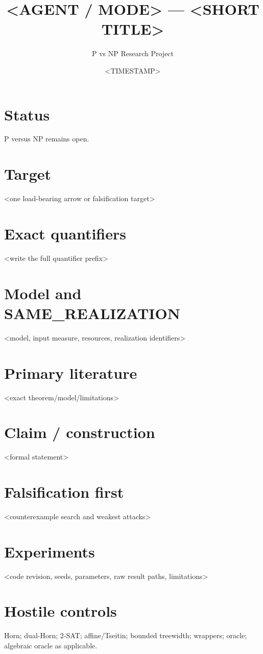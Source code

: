 \documentclass[11pt]{article}
\title{<AGENT / MODE> --- <SHORT TITLE>}
\author{P vs NP Research Project}
\date{<TIMESTAMP>}
\begin{document}
\maketitle

\section*{Status}
P versus NP remains open.

\section*{Target}
<one load-bearing arrow or falsification target>

\section*{Exact quantifiers}
<write the full quantifier prefix>

\section*{Model and SAME\_REALIZATION}
<model, input measure, resources, realization identifiers>

\section*{Primary literature}
<exact theorem/model/limitations>

\section*{Claim / construction}
<formal statement>

\section*{Falsification first}
<counterexample search and weakest attacks>

\section*{Experiments}
<code revision, seeds, parameters, raw result paths, limitations>

\section*{Hostile controls}
Horn; dual-Horn; 2-SAT; affine/Tseitin; bounded treewidth; wrappers; oracle; algebraic oracle as applicable.
\end{document}

